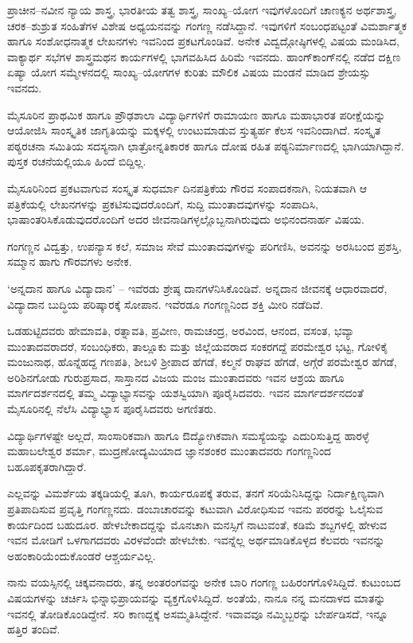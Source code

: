 ಪ್ರಾಚೀನ–ನವೀನ ನ್ಯಾಯ ಶಾಸ್ತ್ರ, ಭಾರತೀಯ ತತ್ವ ಶಾಸ್ತ್ರ, ಸಾಂಖ್ಯ–ಯೋಗ ಇವುಗಳೊಂದಿಗೆ ಚಾಣಕ್ಯನ ಅರ್ಥಶಾಸ್ತ್ರ, ಚರಕ–ಶುಶ್ರುತ ಸಂಹಿತೆಗಳ ವಿಶೇಷ ಅಧ್ಯಯನವನ್ನು ಗಂಗಣ್ಣ ನಡೆಸಿದ್ದಾನೆ. ಇವುಗಳಿಗೆ ಸಂಬಂಧಪಟ್ಟಂತೆ ವಿಮರ್ಶಾತ್ಮಕ ಹಾಗೂ ಸಂಶೋಧನಾತ್ಮಕ ಲೇಖನಗಳು ಇವನಿಂದ ಪ್ರಕಟಗೊಂಡಿವೆ. ಅನೇಕ ವಿದ್ವದ್ಗೋಷ್ಠಿಗಳಲ್ಲಿ ವಿಷಯ ಮಂಡಿಸಿದ, ವಾಕ್ಯಾರ್ಥ ಸಭೆಗಳ ಶಾಸ್ತ್ರಮಥನ ಕಾರ್ಯಗಳಲ್ಲಿ ಭಾಗವಹಿಸಿದ ಹಿರಿಮೆ ಇವನದು. ಹಾಂಗ್‍ಕಾಂಗ್‍ನಲ್ಲಿ ನಡೆದ ದಕ್ಷಿಣ ಏಷ್ಯಾ ಯೋಗ ಸಮ್ಮೇಳನದಲ್ಲಿ ಸಾಂಖ್ಯ–ಯೋಗಗಳ ಕುರಿತು ಮೌಲಿಕ ವಿಷಯ ಮಂಡನೆ ಮಾಡಿದ ಶ್ರೇಯಸ್ಸು ಇವನದು. 

ಮೈಸೂರಿನ ಪ್ರಾಥಮಿಕ ಹಾಗೂ ಪ್ರೌಢಶಾಲಾ ವಿದ್ಯಾರ್ಥಿಗಳಿಗೆ ರಾಮಾಯಣ ಹಾಗೂ ಮಹಾಭಾರತ ಪರೀಕ್ಷೆಯನ್ನು ಆಯೋಜಿಸಿ ಸಾಂಸ್ಕೃತಿಕ ಜಾಗೃತಿಯನ್ನು ಮಕ್ಕಳಲ್ಲಿ ಉಂಟುಮಾಡುವ ಸ್ತುತ್ಯರ್ಹ ಕೆಲಸ ಇವನಿಂದಾಗಿದೆ. ಸಂಸ್ಕೃತ ಪಠ್ಯರಚನಾ ಸಮಿತಿಯ ಸದಸ್ಯನಾಗಿ ಛಾತ್ರೋನ್ನತಿಕಾರಕ ಹಾಗೂ ದೋಷ ರಹಿತ ಪಠ್ಯನಿರ್ಮಾಣದಲ್ಲಿ ಭಾಗಿಯಾಗಿದ್ದಾನೆ. ಪುಸ್ತಕ ರಚನೆಯಲ್ಲಿಯೂ ಹಿಂದೆ ಬಿದ್ದಿಲ್ಲ.

ಮೈಸೂರಿನಿಂದ ಪ್ರಕಟವಾಗುವ ಸಂಸ್ಕೃತ ಸುಧರ್ಮಾ ದಿನಪತ್ರಿಕೆಯ ಗೌರವ ಸಂಪಾದಕನಾಗಿ, ನಿಯತವಾಗಿ ಆ ಪತ್ರಿಕೆಯಲ್ಲಿ ಲೇಖನಗಳನ್ನು ಪ್ರಕಟಿಸುವುದರೊಂದಿಗೆ, ಸುದ್ದಿ ಮುಂತಾದವುಗಳನ್ನು ಸಂಪಾದಿಸಿ, ಭಾಷಾಂತರಿಸಿಕೊಡುವುದರೊಂದಿಗೆ ಅದರ ಜೀವನಾಡಿಗಳ್ಳಲ್ಲೊಬ್ಬನಾಗಿರುವುದು ಅಭಿನಂದನಾರ್ಹ ವಿಷಯ.

ಗಂಗಣ್ಣನ ವಿದ್ವತ್ತು, ಉಪನ್ಯಾಸ ಕಲೆ, ಸಮಾಜ ಸೇವೆ ಮುಂತಾದವುಗಳನ್ನು ಪರಿಗಣಿಸಿ, ಅವನನ್ನು ಅರಸಿಬಂದ ಪ್ರಶಸ್ತಿ, ಸಮ್ಮಾನ ಹಾಗು ಗೌರವಗಳು ಅನೇಕ.

‘ಅನ್ನದಾನ ಹಾಗೂ ವಿದ್ಯಾದಾನ’ – ಇವೆರಡು ಶ್ರೇಷ್ಠ ದಾನಗಳೆನಿಸಿಕೊಂಡಿವೆ. ಅನ್ನದಾನ ಜೀವನಕ್ಕೆ ಆಧಾರವಾದರೆ, ವಿದ್ಯಾದಾನ ಬುದ್ಧಿಯ ಪರಿಷ್ಕಾರಕ್ಕೆ ಸೋಪಾನ. ಇವೆರಡೂ ಗಂಗಣ್ಣನಿಂದ ಶಕ್ತಿ ಮೀರಿ ನಡೆದಿವೆ. 

ಒಡಹುಟ್ಟಿದವರು ಹೇಮಾವತಿ, ರತ್ನಾವತಿ, ಪ್ರವೀಣ, ರಾಮಚಂದ್ರ, ಅರವಿಂದ, ಆನಂದ, ವಸಂತ, ಭವ್ಯಾ ಮುಂತಾದವರಾದರೆ, ಸಂಬಂಧಿಕರು, ತಾಲ್ಲೂಕು ಮತ್ತು ಜಿಲ್ಲೆಯವರಾದ ಸಂಕರಗದ್ದೆ ಪರಮೇಶ್ವರ ಭಟ್ಟ, ಗೋಳಿಕೈ ಮಂಜುನಾಥ, ಹೊನ್ನೆಹದ್ದ ಗಣಪತಿ, ಶೀಬಳಿ ಶ್ರೀಪಾದ ಹೆಗಡೆ, ಕಲ್ಮನೆ ರಾಘವ ಹೆಗಡೆ, ಅಗ್ಗೆರೆ ಪರಮೇಶ್ವರ ಹೆಗಡೆ, ಅರಿಶಿನಗೋಡು ಗುರುಪ್ರಸಾದ, ಸಾಸ್ತಾನದ ವಿಜಯ ಮಂಜ ಮುಂತಾದವರು ಇವನ ಆಶ್ರಯ ಹಾಗೂ ಮಾರ್ಗದರ್ಶನದಲ್ಲಿ ತಮ್ಮ ವಿದ್ಯಾಭ್ಯಾಸವನ್ನು ಯಶಸ್ವಿಯಾಗಿ ಪೂರೈಸಿದವರು. ಇವನ ಮಾರ್ಗದರ್ಶನದಂತೆ ಮೈಸೂರಿನಲ್ಲಿ ನೆಲೆಸಿ ವಿದ್ಯಾಭ್ಯಾಸ ಪೂರೈಸಿದವರು ಅಗಣಿತರು.

ವಿದ್ಯಾರ್ಥಿಗಳಷ್ಟೇ ಅಲ್ಲದೆ, ಸಾಂಸಾರಿಕವಾಗಿ ಹಾಗೂ ಔದ್ಯೋಗಿಕವಾಗಿ ಸಮಸ್ಯೆಯನ್ನು ಎದುರಿಸುತ್ತಿದ್ದ ಹಾರಳ್ಳೆ ಮಹಾಬಲೇಶ್ವರ ಶರ್ಮಾ, ಮುದ್ರಣೋದ್ಯಮಿಯಾದ ಜ್ಞಾನಶಂಕರ ಮುಂತಾದವರು ಗಂಗಣ್ಣನಿಂದ ಬಹೂಪಕೃತರಾಗಿದ್ದಾರೆ.

ಎಲ್ಲವನ್ನು ವಿಮರ್ಶೆಯ ತಕ್ಕಡಿಯಲ್ಲಿ ತೂಗಿ, ಕಾರ್ಯರೂಪಕ್ಕೆ ತರುವ, ತನಗೆ ಸರಿಯೆನಿಸಿದ್ದನ್ನು ನಿರ್ದಾಕ್ಷಿಣ್ಯವಾಗಿ ಪ್ರತಿಪಾದಿಸುವ ಪ್ರವೃತ್ತಿ ಗಂಗಣ್ಣನದು. ಡಂಬಾಚಾರವನ್ನು ಕಟುವಾಗಿ ವಿರೋಧಿಸುವ ಇವನು ಪರರನ್ನು ಓಲೈಸುವ ಕಾರ್ಯದಿಂದ ಬಹುದೂರ. ಹೇಳಬೇಕಾದದ್ದನ್ನು ಮೊನಚಾಗಿ ಮನಸ್ಸಿಗೆ ನಾಟುವಂತೆ, ಕಡಿಮೆ ಶಬ್ದಗಳಲ್ಲಿ ಹೇಳುವ ಇವನ ಮೋಡಿಗೆ ಒಳಗಾಗದವರು ವಿರಳವೆಂದೇ ಹೇಳಬೇಕು. ಇವನ್ನೆಲ್ಲ ಅರ್ಥಮಾಡಿಕೊಳ್ಳದ ಕೆಲವರು ಇವನನ್ನು ಅಹಂಕಾರಿಯೆಂದುಕೊಂಡರೆ ಆಶ್ಚರ್ಯವಿಲ್ಲ.

ನಾನು ವಯಸ್ಸಿನಲ್ಲಿ ಚಿಕ್ಕವನಾದರು, ತನ್ನ ಅಂತರಂಗವನ್ನು ಅನೇಕ ಬಾರಿ ಗಂಗಣ್ಣ ಬಹಿರಂಗಗೊಳಿಸಿದ್ದಿದೆ. ಕುಟುಂಬದ ವಿಷಯಗಳನ್ನು ಚರ್ಚಿಸಿ ಭಿನ್ನಾಭಿಪ್ರಾಯವನ್ನು ವ್ಯಕ್ತಗೊಳಿಸಿದ್ದಿದೆ. ಅಂತೆಯೆ, ನಾನೂ ನನ್ನ ಮನದಾಳದ ಮಾತನ್ನು ಇವನಲ್ಲಿ ತೋಡಿಕೊಂಡಿದ್ದೇನೆ. ಸರಿ ಕಾಣದ್ದಕ್ಕೆ ಅಸಮ್ಮತಿಸಿದ್ದೇನೆ. ಇವಾವವೂ ನಮ್ಮಿಬ್ಬರನ್ನು ಬೇರ್ಪಡಿಸದೆ, ಇನ್ನೂ ಹತ್ತಿರ ತಂದಿವೆ.

